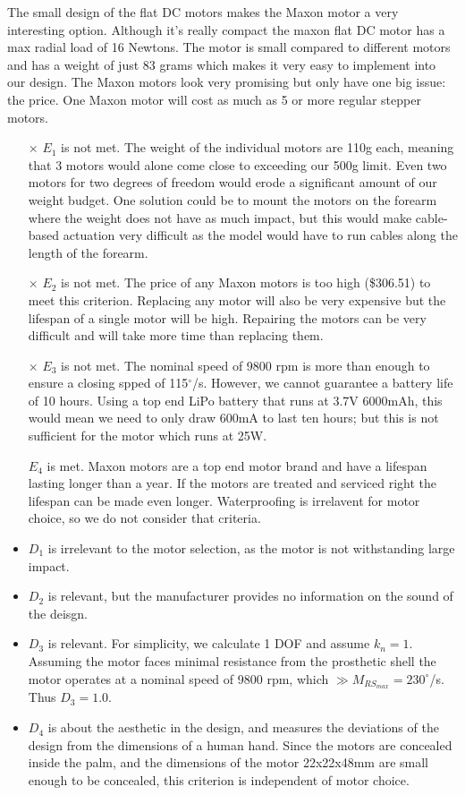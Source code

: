 \documentclass[11pt,3p]{report}
\begin{document}
\begin{multicols}{2}
		The small design of the flat DC motors makes the Maxon motor a very interesting option. Although it's really compact the maxon flat DC motor has a max radial load of 16 Newtons. The motor is small compared to different motors and has a weight of just 83 grams which makes it very easy to implement into our design. The Maxon motors look very promising but only have one big issue: the price. One Maxon motor will cost as much as 5 or more regular stepper motors. 

		\begin{itemize}
		    \item[$\times$] $E_1$ is not met. The weight of the individual motors are 110g each, meaning that 3 motors would alone come close to exceeding our 500g limit. Even two motors for two degrees of freedom would erode a significant amount of our weight budget. One solution could be to mount the motors on the forearm where the weight does not have as much impact, but this would make cable-based actuation very difficult as the model would have to run cables along the length of the forearm.
		    \item[$\times$] $E_2$ is not met. The price of any Maxon motors is too high (\$306.51) to meet this criterion. Replacing any motor will also be very expensive but the lifespan of a single motor will be high. Repairing the motors can be very difficult and will take more time than replacing them.
		    \item[$\times$] $E_3$ is not met. The nominal speed of 9800 rpm is more than enough to ensure a closing spped of 115$^{\circ}$/s. However, we cannot guarantee a battery life of 10 hours. Using a top end LiPo battery that runs at 3.7V 6000mAh, this would mean we need to only draw 600mA to last ten hours; but this is not sufficient for the motor which runs at 25W.
		    \item[\checkmark] $E_4$ is met. Maxon motors are a top end motor brand and have a lifespan lasting longer than a year.  If the motors are treated and serviced right the lifespan can be made even longer. Waterproofing is irrelavent for motor choice, so we do not consider that criteria.
		    \item $D_1$ is irrelevant to the motor selection, as the motor is not withstanding large impact.
		    \item $D_2$ is relevant, but the manufacturer provides no information on the sound of the deisgn.
		    \item $D_3$ is relevant. For simplicity, we calculate 1 DOF and assume $k_n = 1$. Assuming the motor faces minimal resistance from the prosthetic shell the motor operates at a nominal speed of 9800 rpm, which $\gg M_{RS_{max}}= 230^\circ$/s. Thus $D_3 = 1.0$.
		    \item $D_4$ is about the aesthetic in the design, and measures the deviations of the design from the dimensions of a
		    human hand. Since the motors are concealed inside the palm, and the dimensions of the motor 22x22x48mm are small enough to be concealed, this criterion is independent of motor choice.


\end{itemize}
\end{multicols}
\end{document}

